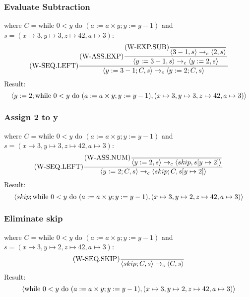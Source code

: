\documentclass{report}
\begin{document}
            \subsubsection*{Evaluate Subtraction}
                where $C = \text{while } 0<y \text{ do } (a:= a \times y; y:= y - 1)$ and $s = (x \mapsto 3, y \mapsto 3, z \mapsto 42, a \mapsto 3)$:
                \[\text{(W-SEQ.LEFT)}\dfrac{
                    \text{(W-ASS.EXP)}\dfrac{
                        \text{(W-EXP.SUB)}\dfrac{}{\langle 3 - 1, s \rangle \to_e \langle 2, s \rangle}
                    }{\langle y := 3 - 1, s \rangle \to_c \langle y := 2, s \rangle}
                }{\langle y := 3 - 1;C, s \rangle \to_c \langle y:= 2;C, s \rangle}\]
                Result:
                \[\langle y:= 2;  \text{while } 0<y \text{ do } (a:= a \times y; y:= y - 1), (x \mapsto 3, y \mapsto 3, z \mapsto 42, a \mapsto 3) \rangle\]
            \subsubsection*{Assign 2 to y}
                where $C = \text{while } 0<y \text{ do } (a:= a \times y; y:= y - 1)$ and $s = (x \mapsto 3, y \mapsto 3, z \mapsto 42, a \mapsto 3)$:
                \[\text{(W-SEQ.LEFT)}\dfrac{
                    \text{(W-ASS.NUM)}\dfrac{}{\langle y:= 2, s \rangle \to_c \langle skip, s[y \mapsto 2] \rangle}
                }{\langle y:= 2;C, s \rangle \to_c \langle skip;C, s[y \mapsto 2] \rangle}\]
                Result:
                \[\langle skip;\text{while } 0<y \text{ do } (a:= a \times y; y:= y - 1), (x \mapsto 3, y \mapsto 2, z \mapsto 42, a \mapsto 3) \rangle\]
            \subsubsection*{Eliminate skip}
                where $C = \text{while } 0<y \text{ do } (a:= a \times y; y:= y - 1)$ and $s = (x \mapsto 3, y \mapsto 2, z \mapsto 42, a \mapsto 3)$:
                \[\text{(W-SEQ.SKIP)}\dfrac{}{\langle skip;C, s \rangle \to_c \langle C, s \rangle}\]
                Result:
                \[\langle \text{while } 0<y \text{ do } (a:= a \times y; y:= y - 1), (x \mapsto 3, y \mapsto 2, z \mapsto 42, a \mapsto 3) \rangle\]
\end{document}
